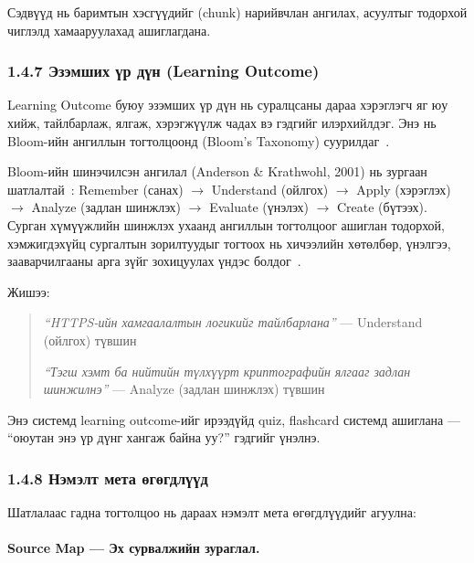 \documentclass[12pt,A4]{report}
\newcommand{\eng}[1]{#1}
\begin{document}
Сэдвүүд нь баримтын хэсгүүдийг (\eng{chunk}) нарийвчлан ангилах, асуултыг тодорхой чиглэлд хамааруулахад ашиглагдана.

\subsubsection{1.4.7 Эзэмших үр дүн (\eng{Learning Outcome})}

\eng{Learning Outcome} буюу эзэмших үр дүн нь суралцсаны дараа хэрэглэгч яг юу хийж, тайлбарлаж, ялгаж, хэрэгжүүлж чадах вэ гэдгийг илэрхийлдэг. Энэ нь Bloom-ийн ангиллын тогтолцоонд (\eng{Bloom's Taxonomy}) суурилдаг~\cite{bloom1956,anderson2001}.

Bloom-ийн шинэчилсэн ангилал (Anderson \& Krathwohl, 2001) нь зургаан шатлалтай~\cite{anderson2001}: \eng{Remember} (санах) $\rightarrow$ \eng{Understand} (ойлгох) $\rightarrow$ \eng{Apply} (хэрэглэх) $\rightarrow$ \eng{Analyze} (задлан шинжлэх) $\rightarrow$ \eng{Evaluate} (үнэлэх) $\rightarrow$ \eng{Create} (бүтээх). Сурган хүмүүжлийн шинжлэх ухаанд ангиллын тогтолцоог ашиглан тодорхой, хэмжигдэхүйц сургалтын зорилтуудыг тогтоох нь хичээлийн хөтөлбөр, үнэлгээ, зааварчилгааны арга зүйг зохицуулах үндэс болдог~\cite{waterloo2026}.

Жишээ:

\begin{quote}
\textit{``HTTPS-ийн хамгаалалтын логикийг тайлбарлана''} --- \eng{Understand} (ойлгох) түвшин

\textit{``Тэгш хэмт ба нийтийн түлхүүрт криптографийн ялгааг задлан шинжилнэ''} --- \eng{Analyze} (задлан шинжлэх) түвшин
\end{quote}

Энэ системд \eng{learning outcome}-ийг ирээдүйд quiz, flashcard системд ашиглана --- ``оюутан энэ үр дүнг хангаж байна уу?'' гэдгийг үнэлнэ.

\subsubsection{1.4.8 Нэмэлт мета өгөгдлүүд}

Шатлалаас гадна тогтолцоо нь дараах нэмэлт мета өгөгдлүүдийг агуулна:

\paragraph{\eng{Source Map} --- Эх сурвалжийн зураглал.}
\end{document}

